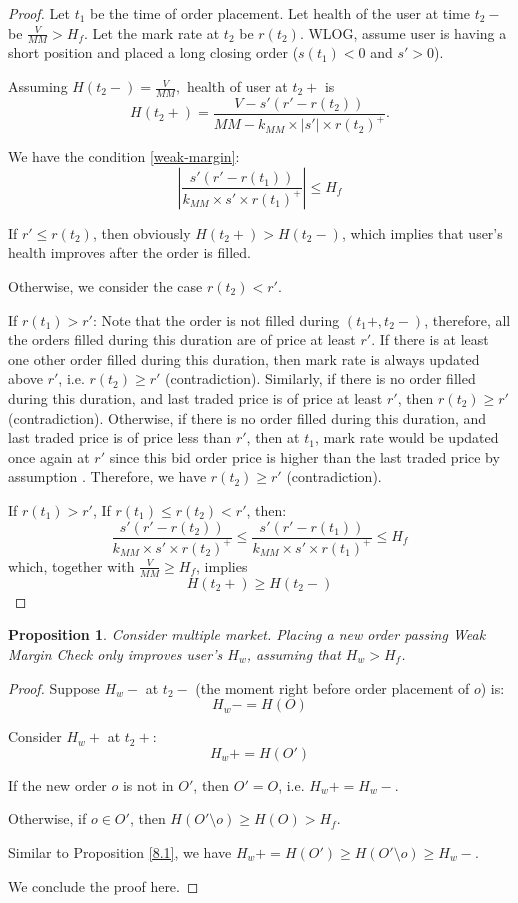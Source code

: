 \documentclass[notitlepage,reqno,11pt]{amsart}
\numberwithin{equation}{section}
\newtheorem{prop}{Proposition}[section]
\begin{document}
\begin{proof}
    Let $t_1$ be the time of order placement. Let health of the user at time $t_2-$ be $\frac{V}{MM}>H_f$. Let the mark rate at $t_2$ be $r(t_2)$. WLOG, assume user is having a short position and placed a long closing order ($s(t_1) < 0$ and  $s' > 0$). 

    Assuming $H(t_2-) = \frac{V}{MM},$ health of user at $t_2+$ is
    $$
    H(t_2+) = \frac{V-s'(r'-r(t_2))}{MM-k_{MM}\times|s'|\times r(t_2)^+}.
    $$
    
    We have the condition \eqref{weak-margin}:
    $$
    \left|\frac{s'(r'-r(t_1))}{k_{MM}\times s'\times r(t_1)^+}\right| \leq H_f
    $$

    If $r' \leq r(t_2)$, then obviously $H(t_2+) > H(t_2-)$, which implies that user's health improves after the order is filled.

    Otherwise, we consider the case $r(t_2) < r'$. 

    If $r(t_1) > r'$: Note that the order is not filled during $(t_1+, t_2-)$, therefore, all the orders filled during this duration are of price at least $r'$. If there is at least one other order filled during this duration, then mark rate is always updated above $r'$, i.e. $r(t_2) \geq r'$ (contradiction). Similarly, if there is no order filled during this duration, and last traded price is of price at least $r'$, then $r(t_2) \geq r'$ (contradiction). Otherwise, if there is no order filled during this duration, and last traded price is of price less than $r'$, then at $t_1$, mark rate would be updated once again at $r'$ since this bid order price is higher than the last traded price by assumption \label{liveness}. Therefore, we have $r(t_2) \geq r'$ (contradiction).
    
    If $r(t_1) > r'$,  If $r(t_1) \leq r(t_2) < r'$, then:
    $$
    \frac{s'(r'-r(t_2))}{k_{MM}\times s'\times r(t_2)^+} \leq \frac{s'(r'-r(t_1))}{k_{MM}\times s'\times r(t_1)^+} \leq H_f
    $$
    which, together with $\frac{V}{MM} \geq H_f$, implies
    $$
    H(t_2+) \geq H(t_2-)
    $$
    
    
\end{proof}
\begin{prop}\label{8.2}
    Consider multiple market. Placing a new order passing Weak Margin Check only improves user's $H_w$, assuming that $H_w > H_f$. 
\end{prop}
\begin{proof}
    Suppose $H_w-$ at $t_2-$ (the moment right before order placement of $o$) is:
    $$
    H_w- = H(O)
    $$
    
    Consider $H_w+$ at $t_2+$:
    $$
    H_w+ = H(O')
    $$
    
    If the new order $o$ is not in $O'$, then $O' = O$, i.e. $H_w+=H_w-$.

    Otherwise, if $o\in O'$, then $H(O'\setminus o) \geq H(O) > H_f$. 

    Similar to Proposition \ref{8.1}, we have $H_w+ = H(O') \geq H(O'\setminus o) \geq H_w-$.

    We conclude the proof here.
\end{proof}
\end{document}
